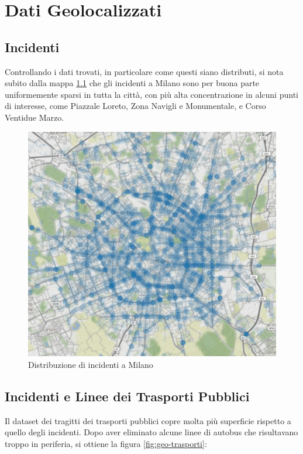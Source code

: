 \documentclass[a4paper]{report}
\begin{document}
\chapter{Dati Geolocalizzati}

\section{Incidenti}

Controllando i dati trovati, in particolare come questi siano distributi, 
si nota subito dalla mappa \ref{fig:geo-incidenti} che gli incidenti a Milano sono per buona parte uniformemente sparsi in tutta la città, 
con più alta concentrazione in alcuni punti di interesse, come Piazzale Loreto, Zona Navigli 
e Monumentale, e Corso Ventidue Marzo.

\begin{figure}
    \includegraphics[width=\linewidth]{../src/incidenti/geo_incidenti.png}
    \caption{Distribuzione di incidenti a Milano}
    \label{fig:geo-incidenti}
\end{figure}



\section{Incidenti e Linee dei Trasporti Pubblici}

Il dataset dei tragitti dei trasporti pubblici copre molta più superficie rispetto a 
quello degli incidenti.
Dopo aver eliminato alcune linee di autobus che risultavano troppo in periferia, 
si ottiene la figura \ref{fig:geo-trasporti}: 
\end{document}
